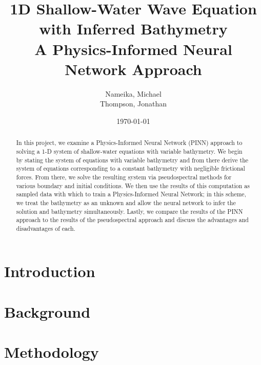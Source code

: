 \documentclass[letterpaper,12pt]{article}
\begin{document}
    \title{\vspace{1.0in}%
        1D Shallow-Water Wave Equation with Inferred Bathymetry\\
        \large A Physics-Informed Neural Network Approach
    }
    \author{%
        Nameika, Michael \\
        Thompson, Jonathan
    }
    \date{\today}

    \maketitle

    \vspace*{1.0in}

    \begin{abstract}
        In this project, we examine a Physics-Informed Neural Network (PINN) approach to solving a 1-D system of 
        shallow-water equations with variable bathymetry. We begin by stating the system of equations with variable
        bathymetry and from there derive the system of equations corresponding to a constant bathymetry with negligible
        frictional forces. From there, we solve the resulting system via pseudospectral methods for various boundary
        and initial conditions. We then use the results of this computation as sampled data with which to train a 
        Physics-Informed Neural Network; in this scheme, we treat the bathymetry as an unknown and allow the 
        neural network to infer the solution and bathymetry simultaneously. Lastly, we compare the results of the PINN
        approach to the results of the pseudospectral approach and discuss the advantages and disadvantages of each.
    \end{abstract}

    \pagebreak

    \section{Introduction}\label{sec:introduction}
        

    \section{Background}\label{sec:background}
        

    \section{Methodology}\label{sec:proposed-methodology}
        
\end{document}
